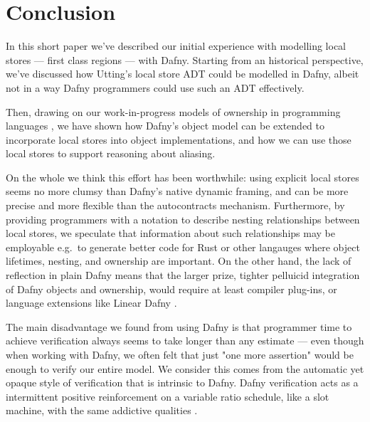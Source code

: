 \section{Conclusion}

In this short paper we've described our initial experience with
modelling local stores --- first class regions --- with Dafny.
Starting from an historical perspective, we've discussed how Utting's
local store ADT could be modelled in Dafny, albeit not in a way Dafny
programmers could use such an ADT effectively.

Then, drawing on our work-in-progress models of ownership in
programming languages \cite{dafnydala-ftfjp2024}, we have shown how
Dafny's object model can be extended to incorporate local stores into
object implementations, and how we can use those local stores to
support reasoning about aliasing.

On the whole we think this effort has been worthwhile: using
explicit local stores seems no more clumsy than Dafny's native dynamic
framing, and can be more precise and more flexible than the
autocontracts mechanism.  Furthermore, by providing programmers with a
notation to describe nesting relationships between local stores, we
speculate that information about such relationships may be employable
e.g.\ to generate better code for Rust or other langauges where object
lifetimes, nesting, and ownership are important.  On the other hand,
the lack of reflection in plain Dafny means that the larger prize,
tighter pelluicid integration of Dafny objects and ownership, would
require at least compiler plug-ins, or language extensions like Linear
Dafny \cite{linear-dafny-oopsla2022}.

The main disadvantage we found from using Dafny is that programmer
time to achieve verification always seems to take longer than any
estimate --- even though when working with 
Dafny, we often felt that just "one more assertion" would be enough to
verify our entire model. We consider this comes from the automatic
yet opaque style of verification that is intrinsic to Dafny. Dafny verification acts as a intermittent positive reinforcement on a variable ratio schedule, like a slot machine, with the same addictive qualities
\cite{dafny-europlop2024}.



